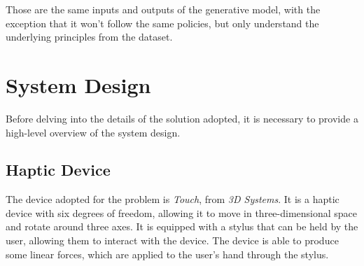 \documentclass[12pt]{report}
\begin{document}
Those are the same inputs and outputs of the generative model, with the exception that it won't follow the same policies, but only understand the underlying principles from the dataset.


\section{System Design}
Before delving into the details of the solution adopted, it is necessary to provide a high-level overview of the system design. 
\subsection{Haptic Device}
The device adopted for the problem is \textit{Touch}, from \textit{3D Systems}. It is a haptic device with six degrees of freedom, allowing it to move in three-dimensional space and rotate around three axes. It is equipped with a stylus that can be held by the user, allowing them to interact with the device. The device is able to produce some linear forces, which are applied to the user's hand through the stylus. 
\end{document}
